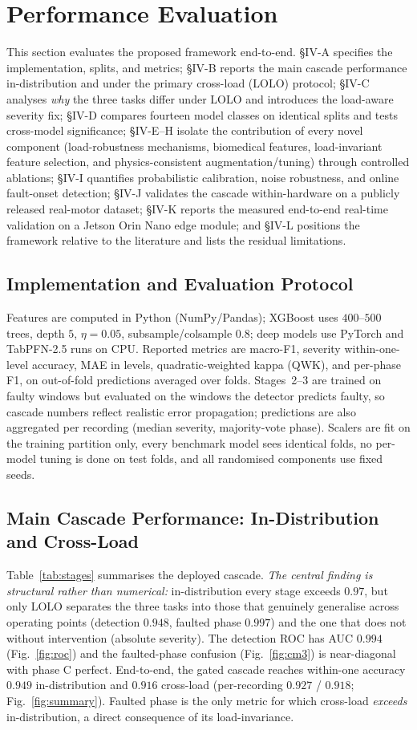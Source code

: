 \documentclass[journal]{IEEEtran}
\begin{document}
\section{Performance Evaluation}
This section evaluates the proposed framework end-to-end. \S IV-A specifies the
implementation, splits, and metrics; \S IV-B reports the main cascade performance
in-distribution and under the primary cross-load (LOLO) protocol; \S IV-C analyses
\emph{why} the three tasks differ under LOLO and introduces the load-aware severity
fix; \S IV-D compares fourteen model classes on identical splits and tests cross-model
significance; \S IV-E--H isolate the contribution of every novel component
(load-robustness mechanisms, biomedical features, load-invariant feature selection,
and physics-consistent augmentation/tuning) through controlled ablations; \S IV-I
quantifies probabilistic calibration, noise robustness, and online fault-onset
detection; \S IV-J validates the cascade within-hardware on a publicly released
real-motor dataset; \S IV-K reports the measured end-to-end real-time validation on
a Jetson Orin Nano edge module; and \S IV-L positions the framework relative to the
literature and lists the residual limitations.


\subsection{Implementation and Evaluation Protocol}
Features are computed in Python (NumPy/Pandas); XGBoost uses $400$--$500$ trees, depth $5$,
$\eta{=}0.05$, subsample/colsample $0.8$; deep models use PyTorch and TabPFN-2.5 runs on
CPU. Reported metrics are macro-F1, severity within-one-level accuracy, MAE in levels,
quadratic-weighted kappa (QWK), and per-phase F1, on out-of-fold predictions averaged over
folds. Stages~2--3 are trained on faulty windows but evaluated on the windows the detector
predicts faulty, so cascade numbers reflect realistic error propagation; predictions are
also aggregated per recording (median severity, majority-vote phase). Scalers are fit on
the training partition only, every benchmark model sees identical folds, no per-model
tuning is done on test folds, and all randomised components use fixed seeds.

\subsection{Main Cascade Performance: In-Distribution and Cross-Load}
Table~\ref{tab:stages} summarises the deployed cascade. \emph{The central finding is
structural rather than numerical:} in-distribution every stage exceeds $0.97$, but only
LOLO separates the three tasks into those that genuinely generalise across operating
points (detection $0.948$, faulted phase $0.997$) and the one that does not without
intervention (absolute severity). The detection ROC has AUC $0.994$ (Fig.~\ref{fig:roc})
and the faulted-phase confusion (Fig.~\ref{fig:cm3}) is near-diagonal with phase C
perfect. End-to-end, the gated cascade reaches within-one accuracy $0.949$ in-distribution
and $0.916$ cross-load (per-recording $0.927$ / $0.918$; Fig.~\ref{fig:summary}). Faulted
phase is the only metric for which cross-load \emph{exceeds} in-distribution, a direct
consequence of its load-invariance.
\end{document}
